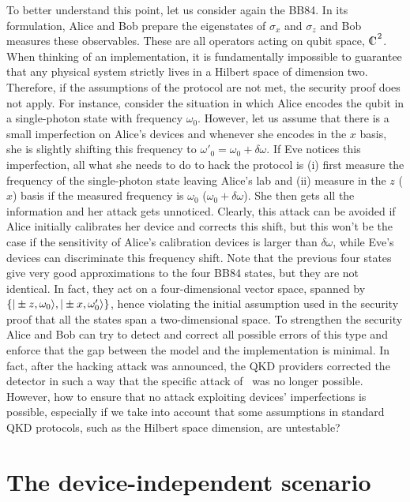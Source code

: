 \documentclass[a4paper]{article}
\def\sz{{\sigma_z}}
\def\sx{{\sigma_x}}
\def\compl{\begin{picture}(8,8)\put(0,0){C}\put(3,0.3){\line(0,1){7}}\end{picture}}
\begin{document}
To better understand this point, let us consider again the BB84. In its formulation, Alice and Bob prepare the eigenstates of $\sx$ and $\sz$ and Bob measures these observables. These are all operators acting on qubit space, $\compl^2$. When thinking of an implementation, it is fundamentally impossible to guarantee that any physical system strictly lives in a Hilbert space of dimension two. Therefore, if the assumptions of the protocol are not met, the security proof does not apply. For instance, consider the situation in which  Alice encodes the qubit in a single-photon state with frequency $\omega_0$. However, let us assume that there is a small imperfection on Alice's devices and whenever she encodes in the $x$ basis, she is slightly shifting this frequency to $\omega'_0=\omega_0+\delta\omega$. If Eve notices this imperfection, all what she needs to do to hack the protocol is (i) first measure the frequency of the single-photon state leaving Alice's lab and (ii) measure in the $z$ ($x$) basis if the measured frequency is $\omega_0$ ($\omega_0+\delta\omega$). She then gets all the information and her attack gets unnoticed. Clearly, this attack can be avoided if Alice initially calibrates her device and corrects this shift, but this won't be the case if the sensitivity of Alice's calibration devices is larger than $\delta\omega$, while Eve's devices can discriminate this frequency shift. Note that the previous four states give very good approximations to the four BB84 states, but they are not identical. In fact, they act on a four-dimensional vector space, spanned by $\{|\pm z,\omega_0\rangle,|\pm x,\omega'_0\rangle\}$, hence violating the initial assumption used in the security proof that all the states span a two-dimensional space. To strengthen the security Alice and Bob can try to detect and correct all possible errors of this type and enforce that the gap between the model and the implementation is minimal. In fact, after the hacking attack was announced, the QKD providers corrected the detector in such a way that the specific attack of~\cite{Makarov} was no longer possible. However, how to ensure that no attack exploiting devices' imperfections is possible, especially if we take into account that some assumptions in standard QKD protocols, such as the Hilbert space dimension, are untestable?

\section{The device-independent scenario}
\end{document}
